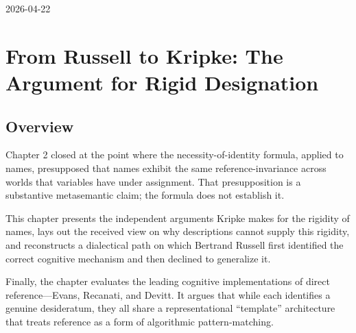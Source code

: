 \documentclass[10pt]{article}
\newlength{\notesmargin}
\begin{document}

\noindent\begin{minipage}{\dimexpr\textwidth+\notesmargin\relax}

  \hfill{\sffamily\normalsize 2026-04-22}

    \vspace{2pt}
  
  \vspace{4pt}
  \noindent{\color{ruleColor}\rule{\linewidth}{0.35pt}}

\end{minipage}

\vspace{3pt}

\section{From Russell to Kripke: The Argument for Rigid Designation}\label{from-russell-to-kripke-the-argument-for-rigid-designation}

\subsection{Overview}\label{overview}

Chapter 2 closed at the point where the necessity-of-identity formula, applied to names, presupposed that names exhibit the same reference-invariance across worlds that variables have under assignment. That presupposition is a substantive metasemantic claim; the formula does not establish it.

This chapter presents the independent arguments Kripke makes for the rigidity of names, lays out the received view on why descriptions cannot supply this rigidity, and reconstructs a dialectical path on which Bertrand Russell first identified the correct cognitive mechanism and then declined to generalize it.

Finally, the chapter evaluates the leading cognitive implementations of direct reference---Evans, Recanati, and Devitt. It argues that while each identifies a genuine desideratum, they all share a representational ``template'' architecture that treats reference as a form of algorithmic pattern-matching.
\end{document}
